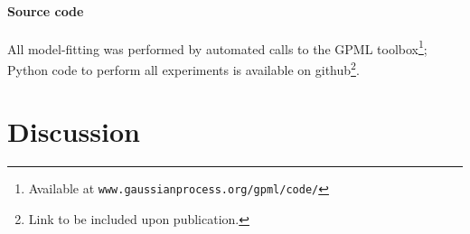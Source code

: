 \documentclass[twoside]{article}
\begin{document}
%
%
%
%



\paragraph{Source code}All \gp{} model-fitting was performed by automated calls to the GPML toolbox\footnote{Available at \texttt{www.gaussianprocess.org/gpml/code/}}; Python code to perform all experiments is available on github\footnote{Link to be included upon publication.}.



\section{Discussion}
\end{document}
